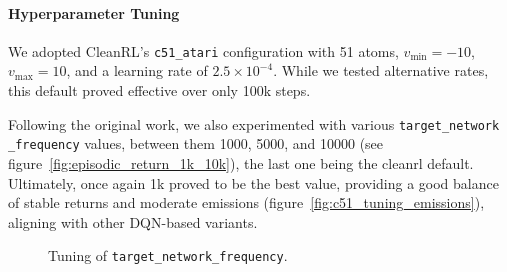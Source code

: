 \paragraph{Hyperparameter Tuning}
We adopted CleanRL’s \texttt{c51\_atari} configuration with 51 atoms, $v_{\min}=-10$, $v_{\max}=10$, 
and a learning rate of $2.5\times10^{-4}$. While we tested alternative rates, 
this default proved effective over only 100k steps.  

Following the original work, we also experimented with various \texttt{target\_network\\\_frequency} values, between them \num{1000}, \num{5000}, and \num{10000} (see figure~\ref{fig:episodic_return_1k_10k}), the last one being the cleanrl default. Ultimately, once again 1k proved to be the best value, providing a good balance of stable returns and moderate emissions (figure~\ref{fig:c51_tuning_emissions}), aligning with other DQN-based variants.

\begin{figure}
	\centering
	\quad
	\caption{Tuning of \texttt{target\_network\_frequency}.}
	\label{fig:c51_tuning}
\end{figure}

